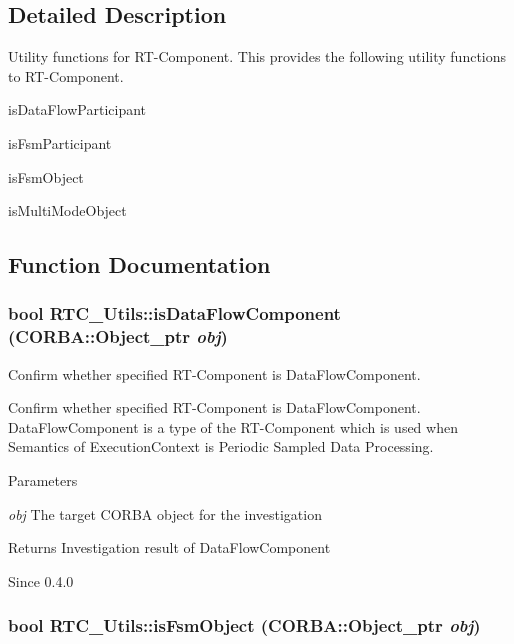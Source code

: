 \subsection{Detailed Description}
Utility functions for RT-\/Component. This provides the following utility functions to RT-\/Component.


\begin{DoxyItemize}
\item isDataFlowParticipant
\item isFsmParticipant
\item isFsmObject
\item isMultiModeObject 
\end{DoxyItemize}

\subsection{Function Documentation}
\subsubsection[{isDataFlowComponent}]{\setlength{\rightskip}{0pt plus 5cm}bool RTC\_\-Utils::isDataFlowComponent (CORBA::Object\_\-ptr {\em obj})}\label{namespaceRTC__Utils_a7615b39670d055183b4dba9a8166c868}


Confirm whether specified RT-\/Component is DataFlowComponent. 

Confirm whether specified RT-\/Component is DataFlowComponent. DataFlowComponent is a type of the RT-\/Component which is used when Semantics of ExecutionContext is Periodic Sampled Data Processing.


\begin{DoxyParams}{Parameters}
\item[{\em obj}]The target CORBA object for the investigation\end{DoxyParams}
\begin{DoxyReturn}{Returns}
Investigation result of DataFlowComponent
\end{DoxyReturn}
\begin{DoxySince}{Since}
0.4.0 
\end{DoxySince}
\subsubsection[{isFsmObject}]{\setlength{\rightskip}{0pt plus 5cm}bool RTC\_\-Utils::isFsmObject (CORBA::Object\_\-ptr {\em obj})}\label{namespaceRTC__Utils_a467f15e404ab93c70887d0d0e003a67d}


